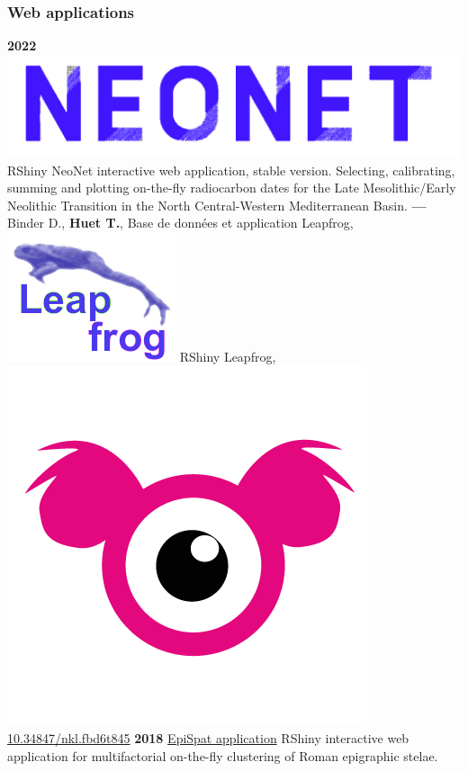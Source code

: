 \documentclass{article}
\begin{document}
\subsubsection*{Web applications}

\smallbreak
\textbf{2022 }\href{http://shinyserver.cfs.unipi.it:3838/C14/}{\includegraphics[scale=0.04]{neonet-blue.png}} \textsf{RShiny} NeoNet interactive web application, stable version. Selecting, calibrating, summing and plotting on-the-fly radiocarbon dates for the Late Mesolithic/Early Neolithic Transition in the North Central-Western Mediterranean Basin.
\smallbreak
\textbf{--- } Binder D., \textbf{Huet T.}, Base de données et application Leapfrog, \href{https://devr.cepam.cnrs.fr/shinyapps/leap/}{\includegraphics[scale=0.10]{leapfrog-blue.png}} \textsf{RShiny} Leapfrog, \href{https://nakala.fr/10.34847/nkl.fbd6t845}{\includegraphics[scale=0.10]{app-nakala.png} 10.34847/nkl.fbd6t845}
\textbf{2018 }\href{https://epispat.shinyapps.io/analyses_mult_5/}{EpiSpat application} \textsf{RShiny} interactive web application for multifactorial on-the-fly clustering of Roman epigraphic stelae.
\smallbreak
\end{document}
